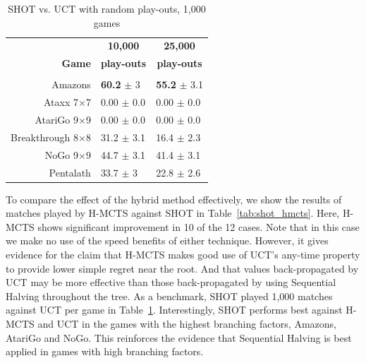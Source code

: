 \documentclass[a4paper]{llncs}
\begin{document}
\begin{table}[ht]
\centering
\tabcolsep=0.45cm
\begin{tabular}{r|ll}
\hline
 & \multicolumn{1}{c}{\textbf{10,000}} & \multicolumn{1}{c}{\textbf{25,000}} \\ 
\textbf{Game} & \multicolumn{1}{c}{\textbf{play-outs}} & \multicolumn{1}{c}{\textbf{play-outs}} \\ [1mm] 
\cline{1-3}
\multicolumn{1}{c|}{} & \multicolumn{2}{c}{} \\ [-3mm]
Amazons 			    	& {\bf{60.2}} $\pm$ 3 	& {\bf{55.2}} $\pm$ 3.1 	\\ [.5mm] 
Ataxx 7$\times$7  			& 0.00 $\pm$ 0.0		& 0.00 $\pm$ 0.0 	\\ [.5mm] 
AtariGo 9$\times$9  		& 0.00 $\pm$ 0.0 		& 0.00 $\pm$ 0.0 	\\ [.5mm] 
Breakthrough 8$\times$8 	& 31.2 $\pm$ 3.1		& 16.4 $\pm$ 2.3 	\\ [.5mm] 
NoGo 9$\times$9  			& 44.7 $\pm$ 3.1 		& 41.4 $\pm$ 3.1 	\\ [.5mm] 
Pentalath 		  			& 33.7 $\pm$ 3 			& 22.8 $\pm$ 2.6 	\\ [.5mm] 
\hline
\end{tabular}
\vspace{4mm}
{\caption{SHOT vs. UCT with random play-outs, 1,000 games} \label{tab:uct_shot}}
\end{table}

To compare the effect of the hybrid method effectively, we show the results of matches played by H-MCTS against SHOT in Table~\ref{tab:shot_hmcts}. Here, H-MCTS shows significant improvement in 10 of the 12 cases. Note that in this case we make no use of the speed benefits of either technique. However, it gives evidence for the claim that H-MCTS makes good use of UCT's any-time property to provide lower simple regret near the root. And that values back-propagated by UCT may be more effective than those back-propagated by using Sequential Halving throughout the tree. 
As a benchmark, SHOT played 1,000 matches against UCT per game in Table~\ref{tab:uct_shot}. Interestingly, SHOT performs best against H-MCTS and UCT in the games with the highest branching factors, Amazons, AtariGo and NoGo. This reinforces the evidence that Sequential Halving is best applied in games with high branching factors.
\end{document}
